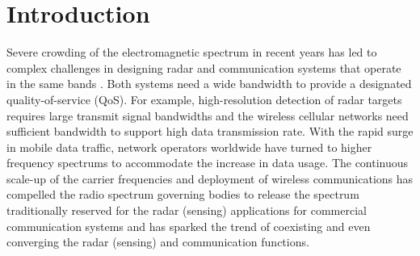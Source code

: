 \documentclass[9pt,journal]{IEEEtran}
\begin{document}
\section{Introduction}
Severe crowding of the electromagnetic spectrum in recent years has led to complex challenges in designing radar and communication systems that operate in the same bands \cite{chiriyath2017radar,mishra2019toward,dokhanchi2019mmwave}. %
Both systems need a wide bandwidth to provide a designated quality-of-service (QoS). For example, high-resolution detection of radar targets requires large transmit signal bandwidths %
and the wireless cellular networks need sufficient bandwidth to support high data transmission rate\cite{biswas2018fdqos}. With the rapid surge in mobile data traffic, network operators worldwide have turned to higher frequency spectrums to accommodate the increase in data usage. The continuous scale-up of the carrier frequencies and deployment of wireless communications has compelled the radio spectrum governing bodies to release the spectrum traditionally reserved for the radar (sensing) applications for commercial communication systems \cite{darpa2016} and has sparked the trend of coexisting and even converging the radar (sensing) and communication functions. %

\end{document}
